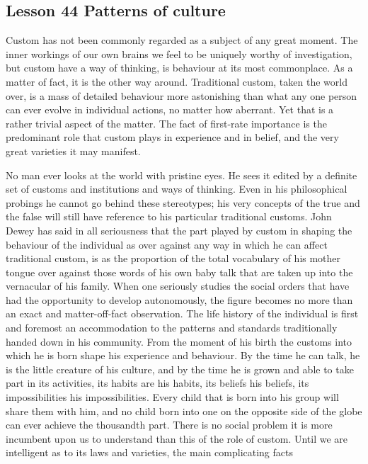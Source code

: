 \documentclass[kindlepaper]{BHCexam4kindle}
\begin{document}
\subsection{Lesson 44
Patterns of culture}
\par
Custom has not been commonly regarded as a subject of any great moment. The inner workings of our own
brains we feel to be uniquely worthy of investigation, but custom have a way of thinking, is behaviour at its
most commonplace. As a matter of fact, it is the other way around. Traditional custom, taken the world over, is
a mass of detailed behaviour more astonishing than what any one person can ever evolve in individual actions,
no matter how aberrant. Yet that is a rather trivial aspect of the matter. The fact of first-rate importance is the
predominant role that custom plays in experience and in belief, and the very great varieties it may manifest.
\par
No man ever looks at the world with pristine eyes. He sees it edited by a definite set of customs and
institutions and ways of thinking. Even in his philosophical probings he cannot go behind these stereotypes; his
very concepts of the true and the false will still have reference to his particular traditional customs. John
Dewey has said in all seriousness that the part played by custom in shaping the behaviour of the individual as
over against any way in which he can affect traditional custom, is as the proportion of the total vocabulary of
his mother tongue over against those words of his own baby talk that are taken up into the vernacular of his
family. When one seriously studies the social orders that have had the opportunity to develop autonomously,
the figure becomes no more than an exact and matter-off-fact observation. The life history of the individual is
first and foremost an accommodation to the patterns and standards traditionally handed down in his community.
From the moment of his birth the customs into which he is born shape his experience and behaviour. By the
time he can talk, he is the little creature of his culture, and by the time he is grown and able to take part in its
activities, its habits are his habits, its beliefs his beliefs, its impossibilities his impossibilities. Every child that
is born into his group will share them with him, and no child born into one on the opposite side of the globe
can ever achieve the thousandth part. There is no social problem it is more incumbent upon us to understand
than this of the role of custom. Until we are intelligent as to its laws and varieties, the main complicating facts
\end{document}
